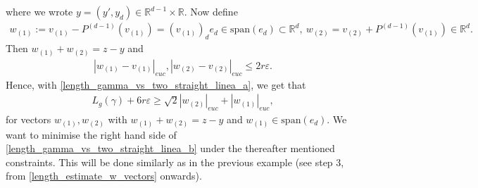 \documentclass[a4paper,10pt]{article}
\numberwithin{equation}{section}
\newcommand{\R}{\mathbb{R}}
\newcommand{\e}{\varepsilon}
\begin{document}
where we wrote $y=(y', y_d) \in \R^{d-1} \times \R$. 
Now define 
\begin{align*}
    w_{(1)}:= v_{(1)}- P^{(d-1)}(v_{(1)}) =  (v_{(1)})_d e_d \in \mathrm{span}(e_d) \subset \R^d , \ w_{(2)} = v_{(2)}+  P^{(d-1)}(v_{(1)}) \in \R^d. 
\end{align*}
Then $w_{(1)}+w_{(2)}= z-y$ and 
\begin{align*}
    |w_{(1)}-v_{(1)}|_{euc}, |w_{(2)}-v_{(2)}|_{euc} \leq 2r\e. 
\end{align*}
Hence, with \eqref{length_gamma_vs_two_straight_linea_a}, we get that
\begin{align}\label{length_gamma_vs_two_straight_linea_b}
    L_g(\gamma) + 6r\e \geq \sqrt{2}|w_{(2)}|_{euc} + |w_{(1)}|_{euc}, 
\end{align}
for vectors $w_{(1)},w_{(2)}$ with $w_{(1)}+w_{(2)} = z-y$ and $w_{(1)} \in \mathrm{span}(e_d)$. We want to minimise the right hand side of \eqref{length_gamma_vs_two_straight_linea_b} under the thereafter mentioned constraints. This will be done similarly as in the previous example (see step 3, from \eqref{length_estimate_w_vectors} onwards). 
\end{document}
